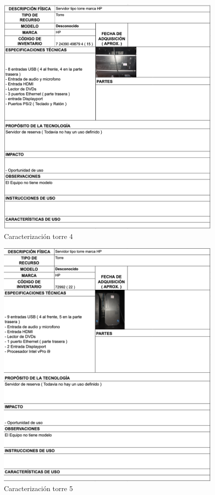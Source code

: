 \begin{figure}[H]
    \centering
    \includegraphics[width=\textwidth] {tablas-images/cp1/torres/torre-4.png}
    \caption{Caracterización torre 4}\label{fig:torre-4}
\end{figure}

\begin{figure}[H]
    \centering
    \includegraphics[width=\textwidth] {tablas-images/cp1/torres/torre-5.png}
    \caption{Caracterización torre 5}\label{fig:torre-5}
\end{figure}

